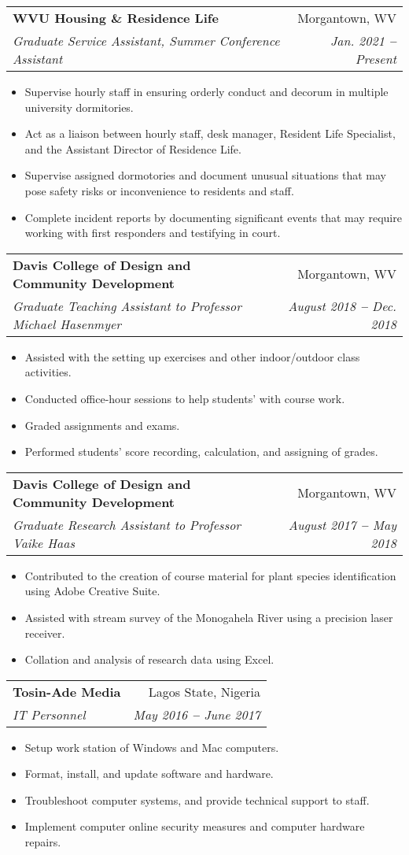 \documentclass[letterpaper,11pt]{article}
\makeatletter
\newcommand{\resumeItem}[1]{
  \item\small{
    {#1 \vspace{-2pt}}
  }
}
\newcommand{\resumeSubheading}[4]{
  \vspace{-2pt}\item
    \begin{tabular*}{0.97\textwidth}[t]{l@{\extracolsep{\fill}}r}
      \textbf{#1} & #2 \\
      \textit{\small#3} & \textit{\small #4} \\
    \end{tabular*}\vspace{-7pt}
}
\newcommand{\resumeItemListStart}{\begin{itemize}}
\newcommand{\resumeItemListEnd}{\end{itemize}\vspace{-5pt}}
\makeatother
\begin{document}
    \resumeSubheading
      {WVU Housing \& Residence Life}{Morgantown, WV}
      {Graduate Service Assistant, Summer Conference Assistant}{Jan. 2021 \textbf{--} Present}
        \resumeItemListStart
          \resumeItem{Supervise hourly staff in ensuring orderly conduct and decorum in multiple university dormitories.}
          \resumeItem{Act as a liaison between hourly staff, desk manager, Resident Life Specialist, and the Assistant Director of Residence Life.}
          \resumeItem{Supervise assigned dormotories and document unusual situations that may pose safety risks or inconvenience to residents and staff.}
          \resumeItem{Complete incident reports by documenting significant events that may require working with first responders and testifying in court.}
        \resumeItemListEnd

    \resumeSubheading
      {Davis College of Design and Community Development}{Morgantown, WV}
      {Graduate Teaching Assistant to Professor Michael Hasenmyer}{August 2018 \textbf{--} Dec. 2018}
        \resumeItemListStart
          \resumeItem{Assisted with the setting up exercises and other indoor/outdoor class activities.}
          \resumeItem{Conducted office-hour sessions to help students' with course work.}
          \resumeItem{Graded assignments and exams.}
          \resumeItem{Performed students' score recording, calculation, and assigning of grades.}
        \resumeItemListEnd

    \resumeSubheading
      {Davis College of Design and Community Development}{Morgantown, WV}
      {Graduate Research Assistant to Professor Vaike Haas}{August 2017 \textbf{--} May 2018}
        \resumeItemListStart
          \resumeItem{Contributed to the creation of course material for plant species identification using Adobe Creative Suite.}
          \resumeItem{Assisted with stream survey of the Monogahela River using a precision laser receiver.}
          \resumeItem{Collation and analysis of research data using Excel.}
        \resumeItemListEnd

    \resumeSubheading
      {Tosin-Ade Media}{Lagos State, Nigeria}
      {IT Personnel}{May 2016 \textbf{--} June 2017}
        \resumeItemListStart
          \resumeItem{Setup work station of Windows and Mac computers.}
          \resumeItem{Format, install, and update software and hardware.}
          \resumeItem{Troubleshoot computer systems, and provide technical support to staff.}
          \resumeItem{Implement computer online security measures and computer hardware repairs.}
        \resumeItemListEnd
\end{document}
